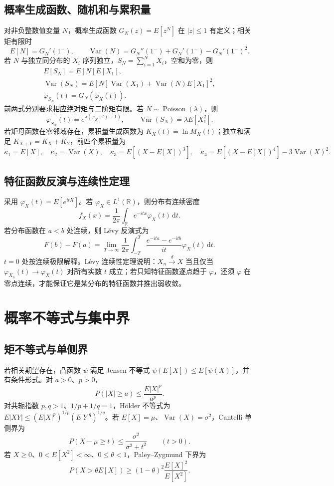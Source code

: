 \documentclass[../main.tex]{subfiles}
\begin{document}
\subsection{概率生成函数、随机和与累积量}
对非负整数值变量 $N$，概率生成函数 $G_N(z)=E[z^N]$ 在 $|z|\le1$ 有定义；相关矩有限时
\[
E[N]=G_N'(1^-),\qquad
\operatorname{Var}(N)=G_N''(1^-)+G_N'(1^-)-G_N'(1^-)^2.
\]
若 $N$ 与独立同分布的 $X_i$ 序列独立，$S_N=\sum_{i=1}^NX_i$，空和为零，则
\begin{gather*}
E[S_N]=E[N]E[X_1],\\
\operatorname{Var}(S_N)=E[N]\operatorname{Var}(X_1)+\operatorname{Var}(N)E[X_1]^2,\\
\varphi_{S_N}(t)=G_N(\varphi_X(t)).
\end{gather*}
前两式分别要求相应绝对矩与二阶矩有限。若 $N\sim\operatorname{Poisson}(\lambda)$，则
\[
\varphi_{S_N}(t)=e^{\lambda(\varphi_X(t)-1)},\qquad
\operatorname{Var}(S_N)=\lambda E[X_1^2].
\]
若矩母函数在零邻域存在，累积量生成函数为 $K_X(t)=\ln M_X(t)$；独立和满足 $K_{X+Y}=K_X+K_Y$，前四个累积量为
\[
\kappa_1=E[X],\quad\kappa_2=\operatorname{Var}(X),\quad
\kappa_3=E[(X-E[X])^3],\quad
\kappa_4=E[(X-E[X])^4]-3\operatorname{Var}(X)^2.
\]

\subsection{特征函数反演与连续性定理}
采用 $\varphi_X(t)=E[e^{itX}]$。若 $\varphi_X\in L^1(\mathbb R)$，则分布有连续密度
\[
f_X(x)=\frac1{2\pi}\int_{\mathbb R}e^{-itx}\varphi_X(t)\,\mathrm dt.
\]
若分布函数在 $a<b$ 处连续，则 Lévy 反演式为
\[
F(b)-F(a)=\lim_{T\to\infty}\frac1{2\pi}\int_{-T}^T
\frac{e^{-ita}-e^{-itb}}{it}\varphi_X(t)\,\mathrm dt.
\]
$t=0$ 处按连续极限解释。Lévy 连续性定理说明：$X_n\xrightarrow d X$ 当且仅当 $\varphi_{X_n}(t)\to\varphi_X(t)$ 对所有实数 $t$ 成立；若只知特征函数逐点趋于 $\varphi$，还须 $\varphi$ 在零点连续，才能保证它是某分布的特征函数并推出弱收敛。

\section{概率不等式与集中界}
\subsection{矩不等式与单侧界}
若相关期望存在，凸函数 $\psi$ 满足 Jensen 不等式 $\psi(E[X])\le E[\psi(X)]$，并有条件形式。对 $a>0$、$p>0$，
\[
P(|X|\ge a)\le\frac{E|X|^p}{a^p}.
\]
对共轭指数 $p,q>1$、$1/p+1/q=1$，Hölder 不等式为 $E|XY|\le(E|X|^p)^{1/p}(E|Y|^q)^{1/q}$。若 $E[X]=\mu$、$\operatorname{Var}(X)=\sigma^2$，Cantelli 单侧界为
\[
P(X-\mu\ge t)\le\frac{\sigma^2}{\sigma^2+t^2}\qquad(t>0).
\]
若 $X\ge0$、$0<E[X^2]<\infty$、$0\le\theta<1$，Paley--Zygmund 下界为
\[
P(X>\theta E[X])\ge(1-\theta)^2\frac{E[X]^2}{E[X^2]}.
\]
\end{document}
